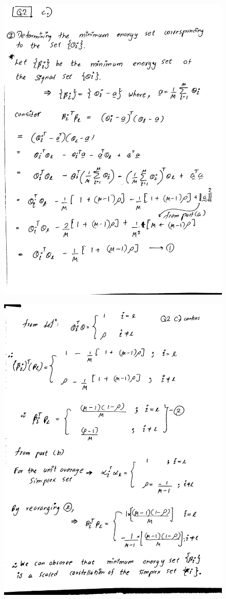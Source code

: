 \documentclass[a4paper,11pt]{article}%
\begin{document}
\begin{figure}[!h]
	\includegraphics[scale=0.22]{figures/img9}
\end{figure}

\begin{figure}[!h]
	\includegraphics[scale=0.22]{figures/img10}
\end{figure}


\end{document}
